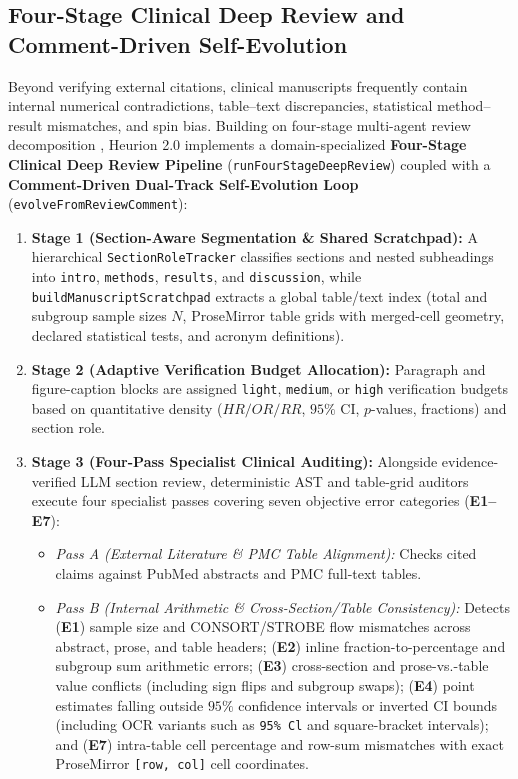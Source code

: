 \documentclass[11pt,a4paper]{article}
\begin{document}
\subsection{Four-Stage Clinical Deep Review and Comment-Driven Self-Evolution}
\label{sec:deep_review}
Beyond verifying external citations, clinical manuscripts frequently contain internal numerical contradictions, table--text discrepancies, statistical method--result mismatches, and spin bias. Building on four-stage multi-agent review decomposition \cite{googlepat2026}, Heurion 2.0 implements a domain-specialized \textbf{Four-Stage Clinical Deep Review Pipeline} (\texttt{runFourStageDeepReview}) coupled with a \textbf{Comment-Driven Dual-Track Self-Evolution Loop} (\texttt{evolveFromReviewComment}):

\begin{enumerate}[leftmargin=1.5em,itemsep=2pt]
  \item \textbf{Stage 1 (Section-Aware Segmentation \& Shared Scratchpad):} A hierarchical \texttt{SectionRoleTracker} classifies sections and nested subheadings into \texttt{intro}, \texttt{methods}, \texttt{results}, and \texttt{discussion}, while \texttt{buildManuscriptScratchpad} extracts a global table/text index (total and subgroup sample sizes $N$, ProseMirror table grids with merged-cell geometry, declared statistical tests, and acronym definitions).
  \item \textbf{Stage 2 (Adaptive Verification Budget Allocation):} Paragraph and figure-caption blocks are assigned \texttt{light}, \texttt{medium}, or \texttt{high} verification budgets based on quantitative density ($HR/OR/RR$, $95\%$ CI, $p$-values, fractions) and section role.
  \item \textbf{Stage 3 (Four-Pass Specialist Clinical Auditing):} Alongside evidence-verified LLM section review, deterministic AST and table-grid auditors execute four specialist passes covering seven objective error categories (\textbf{E1--E7}):
  \begin{itemize}[leftmargin=1.2em,itemsep=1pt]
    \item \emph{Pass A (External Literature \& PMC Table Alignment):} Checks cited claims against PubMed abstracts and PMC full-text tables.
    \item \emph{Pass B (Internal Arithmetic \& Cross-Section/Table Consistency):} Detects (\textbf{E1}) sample size and CONSORT/STROBE flow mismatches across abstract, prose, and table headers; (\textbf{E2}) inline fraction-to-percentage and subgroup sum arithmetic errors; (\textbf{E3}) cross-section and prose-vs.-table value conflicts (including sign flips and subgroup swaps); (\textbf{E4}) point estimates falling outside $95\%$ confidence intervals or inverted CI bounds (including OCR variants such as \texttt{95\% Cl} and square-bracket intervals); and (\textbf{E7}) intra-table cell percentage and row-sum mismatches with exact ProseMirror \texttt{[row, col]} cell coordinates.

\end{itemize}
\end{enumerate}
\end{document}
